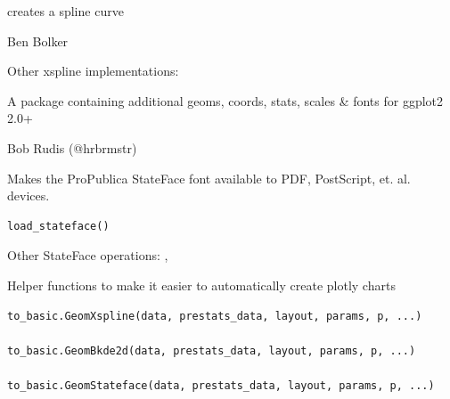 \documentclass[a4paper]{book}
\begin{document}
%
\begin{Value}
creates a spline curve
\end{Value}
%
\begin{Author}
Ben Bolker
\end{Author}
%
\begin{SeeAlso}
Other xspline implementations: 
\end{SeeAlso}
%
\begin{Description}
A package containing additional geoms, coords, stats, scales \& fonts
for ggplot2 2.0+
\end{Description}
%
\begin{Author}
Bob Rudis (@hrbrmstr)
\end{Author}
%
\begin{Description}
Makes the ProPublica StateFace font available to PDF, PostScript,
et. al. devices.
\end{Description}
%
\begin{Usage}
\begin{verbatim}
load_stateface()
\end{verbatim}
\end{Usage}
%
\begin{SeeAlso}
Other StateFace operations: 
,
\end{SeeAlso}
%
\begin{Description}
Helper functions to make it easier to automatically create plotly charts
\end{Description}
%
\begin{Usage}
\begin{verbatim}
to_basic.GeomXspline(data, prestats_data, layout, params, p, ...)

to_basic.GeomBkde2d(data, prestats_data, layout, params, p, ...)

to_basic.GeomStateface(data, prestats_data, layout, params, p, ...)
\end{verbatim}
\end{Usage}
\end{document}
